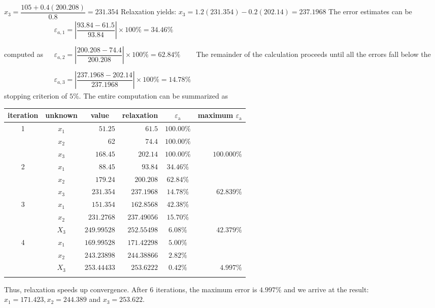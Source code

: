 \documentclass[../main.tex]{subfiles}
\begin{document}
\begin{enumerate}[label=\bfseries(\alph*)]
\bigbreak
$x_{3}=\dfrac{105+0.4(200.208)}{0.8}=231.354$
\bigbreak
Relaxation yields: $x_{3}=1.2(231.354)-0.2(202.14)=237.1968$
\bigbreak
The error estimates can be computed as
\bigbreak$
\begin{aligned}
&\varepsilon_{a, 1}=\left|\dfrac{93.84-61.5}{93.84}\right| \times 100 \%=34.46 \% \\\\
&\varepsilon_{a, 2}=\left|\dfrac{200.208-74.4}{200.208}\right| \times 100 \%=62.84 \% \\\\
&\varepsilon_{a, 3}=\left|\dfrac{237.1968-202.14}{237.1968}\right| \times 100 \%=14.78 \%
\end{aligned}$
\bigbreak
The remainder of the calculation proceeds until all the errors fall below the stopping criterion of $5 \%$. \smallbreak The entire computation can be summarized as
\bigbreak
\begin{tabular}{ccrrcr}
\Xhline{1.5pt}
iteration & unknown & \multicolumn{1}{c}{value} & relaxation & $\varepsilon_{\mathrm{a}}$ & maximum $\varepsilon_{\mathrm{a}}$ \\
\hline
1 & $x_{1}$ & $51.25$ & $61.5$ & $100.00 \%$ &  \\
 & $x_{2}$ & 62 & $74.4$ & $100.00 \%$ &  \\
 & $x_{3}$ & $168.45$ & $202.14$ & $100.00 \%$ & $100.000 \%$ \\
\hline
2 & $x_{1}$ & $88.45$ & $93.84$ & $34.46 \%$ &  \\
 & $x_{2}$ & $179.24$ & $200.208$ & $62.84 \%$ &  \\
 & $x_{3}$ & $231.354$ & $237.1968$ & $14.78 \%$ & $62.839 \%$ \\
\hline
3 & $x_{1}$ & $151.354$ & $162.8568$ & $42.38 \%$ &  \\
 & $x_{2}$ & $231.2768$ & $237.49056$ & $15.70 \%$ &  \\
 & $X_{3}$ & $249.99528$ & $252.55498$ & $6.08 \%$ & $42.379 \%$ \\
\hline
4 & $x_{1}$ & $169.99528$ & $171.42298$ & $5.00 \%$ &  \\
 & $x_{2}$ & $243.23898$ & $244.38866$ & $2.82 \%$ &  \\
 & $X_{3}$ & $253.44433$ & $253.6222$ & $0.42 \%$ & $4.997 \%$ \\
\Xhline{1.5pt}
\end{tabular}
\bigbreak
Thus, relaxation speeds up convergence. After 6 iterations, the maximum error is $4.997 \%$ and we arrive at the result: $x_{1}=171.423, x_{2}=244.389$ and $x_{3}=253.622$.
\bigbreak



\end{enumerate}
\end{document}
